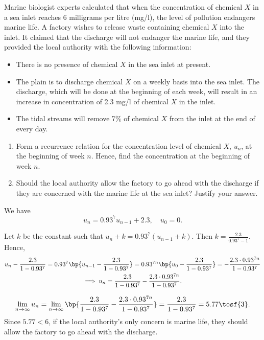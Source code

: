 \begin{problem}
    Marine biologist experts calculated that when the concentration of chemical $X$ in a sea inlet reaches 6 milligrams per litre (mg/l), the level of pollution endangers marine life. A factory wishes to release waste containing chemical $X$ into the inlet. It claimed that the discharge will not endanger the marine life, and they provided the local authority with the following information:

    \begin{itemize}
        \item There is no presence of chemical $X$ in the sea inlet at present.
        \item The plain is to discharge chemical $X$ on a weekly basis into the sea inlet. The discharge, which will be done at the beginning of each week, will result in an increase in concentration of 2.3 mg/l of chemical $X$ in the inlet.
        \item The tidal streams will remove 7\% of chemical $X$ from the inlet at the end of every day.
    \end{itemize}

    \begin{enumerate}
        \item Form a recurrence relation for the concentration level of chemical $X$, $u_n$, at the beginning of week $n$. Hence, find the concentration at the beginning of week $n$.
        \item Should the local authority allow the factory to go ahead with the discharge if they are concerned with the marine life at the sea inlet? Justify your answer.
    \end{enumerate}
\end{problem}
\begin{solution}
    \begin{ppart}
        We have \[u_n = 0.93^7 u_{n-1} + 2.3, \quad u_0 = 0.\]

        Let $k$ be the constant such that $u_n + k = 0.93^7 (u_{n-1} + k)$. Then $k = \frac{2.3}{0.93^7 - 1}$. Hence, 
        \begin{gather*}
            u_n - \frac{2.3}{1 - 0.93^7} = 0.93^7 \bp{u_{n-1} - \frac{2.3}{1 - 0.93^7}} = 0.93^{7n} \bp{u_0 - \frac{2.3}{1 - 0.93^7}} = - \frac{2.3 \cdot 0.93^{7n}}{1 - 0.93^7}\\
            \implies u_n = \frac{2.3}{1 - 0.93^7} - \frac{2.3 \cdot 0.93^{7n}}{1 - 0.93^7}.
        \end{gather*}
    \end{ppart}
    \begin{ppart}
        \[\lim_{n \to \infty} u_n = \lim_{n \to \infty} \bp{\frac{2.3}{1 - 0.93^7} - \frac{2.3 \cdot 0.93^{7n}}{1 - 0.93^7}} = \frac{2.3}{1 - 0.93^7} = 5.77 \tosf{3}.\] Since $5.77 < 6$, if the local authority's only concern is marine life, they should allow the factory to go ahead with the discharge.
    \end{ppart}
\end{solution}

